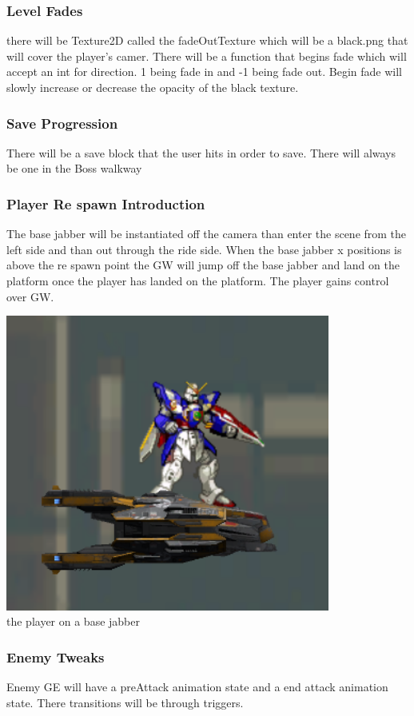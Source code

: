 \documentclass{article}
\begin{document}
\subsubsection*{Level Fades}
there will be Texture2D called the fadeOutTexture which will be a black.png that will cover the player's camer. There will be a function that begins fade which will accept an int for direction. 1 being fade in and -1 being fade out. Begin fade will slowly increase or decrease the opacity of the black texture.
\subsubsection*{Save Progression}
There will be a save block that the user hits in order to save. There will always be one in the Boss walkway 
\subsubsection*{Player Re spawn Introduction}
The base jabber will be instantiated off the camera than enter the scene from the left side and than out through the ride side. When the base jabber x positions is above the re spawn point the GW will jump off the base jabber and land on the platform once the player has landed on the platform. The player gains control over GW.



        \includegraphics[width=0.8\textwidth]{baseJabber.png} \\
        the player on a base jabber



\subsubsection*{Enemy Tweaks}
Enemy GE will have a preAttack animation state and a end attack animation state. There transitions will be through triggers.
\end{document}
